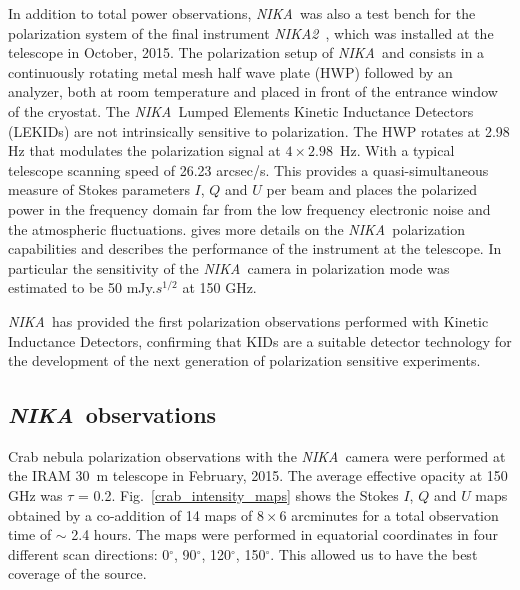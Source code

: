 \documentclass[twocolumn,traditabstract]{aa}
\def\NIKA{\textit{NIKA}}
\def\NIKAd{\textit{NIKA2}}
\begin{document}
In addition to total power observations, \NIKA\ was also a test
bench for the polarization system of the final instrument
\NIKAd\ \citep{calvo2016,catalano2016nika2,2017arXiv170700908A}, which was installed at the
telescope in October, 2015. The polarization setup of \NIKA\ and 
consists in a continuously rotating metal mesh half wave plate (HWP)
followed by an analyzer, both at room temperature and placed in
front of the entrance window of the cryostat. The \NIKA\ Lumped Elements Kinetic
Inductance Detectors (LEKIDs) are not intrinsically sensitive to
polarization. The HWP rotates at 2.98 Hz that modulates the polarization signal
at $4\times 2.98$~Hz. With a typical telescope scanning speed of 26.23 arcsec/s.
This provides a quasi-simultaneous measure of Stokes parameters $I$, $Q$ and $U$
per beam and
places the polarized power in the frequency domain far from the low frequency
electronic noise and the atmospheric fluctuations. \cite{ritacco2017} gives more
details on the \NIKA\ polarization capabilities and describes the performance of
the instrument at the telescope. In particular the sensitivity of the
\NIKA\ camera in polarization mode was estimated to be 50 mJy.$s^{1/2}$ at 150
GHz.

\NIKA\ has provided the first polarization
observations performed with Kinetic Inductance Detectors, confirming that KIDs are a
suitable detector technology for the development of the next generation of polarization sensitive
experiments.

\subsection{\NIKA\ observations}\label{sec:nika_observations}
Crab nebula polarization observations with the \NIKA\ camera were performed at
the IRAM 30~m telescope in February, 2015. The average effective opacity at 150 GHz was $\tau$ = 0.2.  Fig.~\ref{crab_intensity_maps} shows
the Stokes $I$, $Q$ and $U$ maps obtained by a co-addition of 14 maps
of $8 \times 6$ arcminutes for a total observation time of $\sim$ 2.4 hours. The
maps were performed in equatorial coordinates in four different scan
directions: 0$^{\circ}$, 90$^{\circ}$, 120$^{\circ}$, 150$^{\circ}$. This
allowed us to have the best coverage of the source.%
\end{document}
